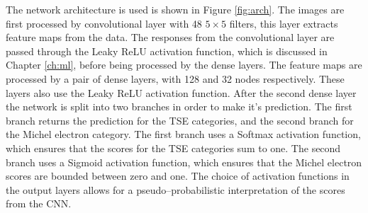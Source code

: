 The network architecture is used is shown in Figure \ref{fig:arch}. The images
are first processed by convolutional layer with 48 $5 \times 5$ filters, this
layer extracts feature maps from the data. The responses from the 
convolutional layer are passed through the Leaky ReLU activation function, which
is discussed in Chapter \ref{ch:ml}, before being processed by the dense 
layers. The feature maps are processed by a pair of dense layers, with 128 and 
32 nodes respectively. These layers also use the Leaky ReLU activation
function. After the second dense layer the network is split into two branches in
order to make it's prediction. The first branch returns the prediction for the 
TSE categories, and the second branch for the Michel electron category. The 
first branch uses a Softmax activation function, which ensures that the scores 
for the TSE categories sum to one.  The second branch uses a Sigmoid 
activation function, which ensures that the Michel electron scores are bounded 
between zero and one. The choice of activation functions in the output layers 
allows for a pseudo--probabilistic interpretation of the scores from the CNN.

